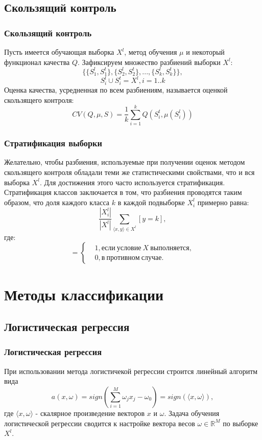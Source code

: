 \documentclass{beamer}
\begin{document}
\subsection{Скользящий контроль}
\begin{frame}
\frametitle{Скользящий контроль}
	Пусть имеется обучающая выборка $X^l$, метод обучения $\mu$ и некоторый функционал качества $Q$. Зафиксируем множество разбиений выборки $X^l$:
	$$\{\{S_1^l,S_1^t\},\{S_2^l,S_2^t\},...,\{S_k^l,S_k^t\}\},$$
	$$S_i^l \cup S_i^t = X^l, i=1..k$$
	Оценка качества, усредненная по всем разбиениям, называется оценкой скользящего контроля:
	$$CV(Q,\mu,S)=\frac{1}{k}\sum\limits_{i=1}^{k}Q(S_i^t,\mu(S_i^l))$$
\end{frame}

\begin{frame}
\frametitle{Стратификация выборки}
	Желательно, чтобы разбиения, используемые при получении оценок методом скользящего контроля обладали теми же статистическими свойствами, что и вся выборка $X^l$. Для достижения этого часто используется стратификация.
	\newline
	\newline
	Стратификация классов заключается в том, что разбиения проводятся таким образом, что доля каждого класса $k$ в каждой подвыборке $X_i^l$ примерно равна:
	$$\frac{|X_i^l|}{|X^l|}\sum\limits_{\langle x,y \rangle \in X^l}^{}[y=k],$$
	где:\\
	\begin{equation*}
	[X]=
	\begin{cases}
	&1, если\ условие\ X\ выполняется,\\
	&0, в\ противном\ случае.
	\end{cases}
	\end{equation*}
\end{frame}

\section{Методы классификации}
\subsection{Логистическая регрессия}
\begin{frame}
\frametitle{Логистическая регрессия}
При использовании метода логистичекой регрессии строится линейный алгоритм вида
$$a(x,\omega)=sign\left(\sum\limits_{i=1}^M\omega_j x_j-\omega_0\right)=sign\left(\langle x,\omega \rangle\right),$$ где $\langle x,\omega \rangle$ - скалярное произведение векторов $x$ и $\omega$.
\newline
\newline
Задача обучения логистической регрессии сводится к настройке вектора весов $\omega\in \mathbb{R}^M$ по выборке $X^l$.
\end{frame}
\end{document}
